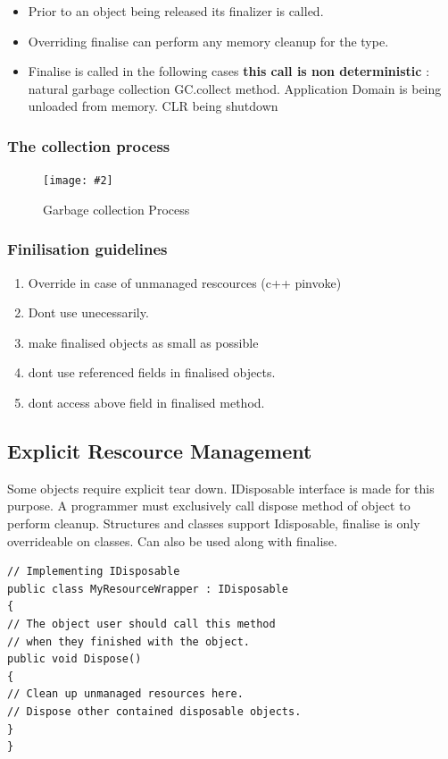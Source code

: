 \documentclass[a4paper,10pt]{scrartcl}
\newcommand{\pic}[2][Figure]{
  \begin{figure}[h!]
   \centering
   \texttt{[image: \#2]}
   \caption{{#1}}
  \end{figure}
}
\begin{document}
\begin{itemize}
 \item Prior to an object being released its finalizer is called.
 \item Overriding finalise can perform any memory cleanup for the type.
 \item Finalise is called in the following cases \textbf{this call is non deterministic} : 
  \subitem natural garbage collection
  \subitem GC.collect method.
  \subitem Application Domain is being unloaded from memory.
  \subitem CLR being shutdown
\end{itemize}

\subsubsection{The collection process}
\pic[Garbage collection Process]{gcprocess.png}

\subsubsection{Finilisation guidelines}
\begin{enumerate}
 \item Override in case of unmanaged rescources (c++ pinvoke)
 \item Dont use unecessarily.
 \item make finalised objects as small as possible
 \item dont use referenced fields in finalised objects.
 \item dont access above field in finalised method.
\end{enumerate}

\subsection{Explicit Rescource Management}
Some objects require explicit tear down. IDisposable interface is made for this purpose. A programmer must exclusively call dispose method of object to perform cleanup.
Structures and classes support Idisposable, finalise is only overrideable on classes. Can also be used along with finalise.

\begin{lstlisting}[caption=Idisposable example]
 // Implementing IDisposable
public class MyResourceWrapper : IDisposable
{
// The object user should call this method
// when they finished with the object.
public void Dispose()
{
// Clean up unmanaged resources here.
// Dispose other contained disposable objects.
}
}

\end{lstlisting}
\end{document}
